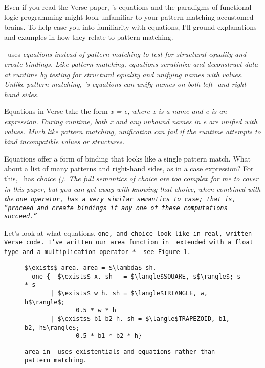 \documentclass[manuscript,screen,review, 12pt, nonacm]{acmart}
\begin{document}
\begin{outline}[enumerate]
    Even if you read the Verse paper, \VC's equations and the paradigms of
    functional logic programming might look unfamiliar to your pattern
    matching-accustomed brains. To help ease you into familiarity with
    equations, I'll ground explanations and examples in how they relate to
    pattern matching. 

    \VC\ uses \it{equations} instead of pattern matching to test for structural
    equality and create bindings. Like pattern matching, equations scrutinize
    and deconstruct data at runtime by testing for structural equality and
    unifying names with values. Unlike pattern matching, \VC's equations can
    unify names on both left- \it{and} right-hand sides. 

    Equations in Verse take the form \it{x = e}, where \it{x} is a name and
    \it{e} is an expression. During runtime, both \it{x} and any unbound names
    in \it{e} are unified with values. Much like pattern matching, unification
    can fail if the runtime attempts to bind incompatible values or structures. 

    Equations offer a form of binding that looks like a single pattern match.
    What about a list of many patterns and right-hand sides, as in a case
    expression? For this, \VC\ has \it{choice} (\choice). The full semantics of
    choice are too complex for me to cover in this paper, but you can get away
    with knowing that choice, when combined with the \tt{one} operator, has a
    very similar semantics to case; that is, “proceed and create bindings if any
    one of these computations succeed.” 

    Let's look at what equations, \tt{one}, and choice look like in real,
    written Verse code. I've written our \tt{area} function in \VC\ extended
    with a \tt{float} type and a multiplication operator \tt{*}- see
    Figure~\ref{fig:versearea}. 

    \begin{figure}[]
        \verselst
        \begin{lstlisting}[numbers=none]
$\exists$ area. area = $\lambda$ sh. 
  one {  $\exists$ x. sh   = $\langle$SQUARE, s$\rangle$; s * s
       | $\exists$ w h. sh = $\langle$TRIANGLE, w, h$\rangle$; 
              0.5 * w * h
       | $\exists$ b1 b2 h. sh = $\langle$TRAPEZOID, b1, b2, h$\rangle$; 
              0.5 * b1 * b2 * h}
        \end{lstlisting}
    \caption{\tt{area} in \VC\ uses existentials and equations rather than
    pattern matching.} 
    \label{fig:versearea}
    \end{figure}


\end{outline}
\end{document}
